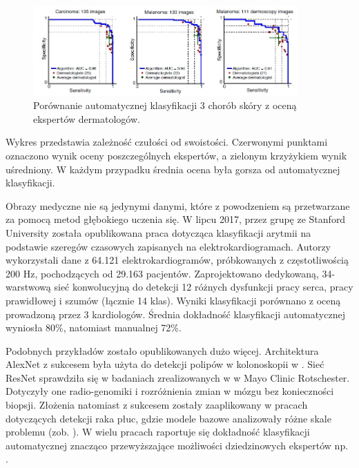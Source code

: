  \begin{figure}[h!]
 	\centering
 	\includegraphics[width=0.9\textwidth]{figures/CAD-dermatolodzy.jpg}
 	\caption{Porównanie automatycznej klasyfikacji 3 chorób skóry z oceną ekspertów dermatologów.}
 	\label{CAD_derma}
 \end{figure}

Wykres przedstawia zależność czułości od swoistości. Czerwonymi punktami oznaczono wynik oceny poszczególnych ekspertów, a zielonym krzyżykiem wynik uśredniony. W każdym przypadku średnia ocena była gorsza od automatycznej klasyfikacji.

Obrazy medyczne nie są jedynymi danymi, które z powodzeniem są przetwarzane za pomocą metod głębokiego uczenia się. W lipcu 2017, przez grupę ze Stanford University została opublikowana praca \cite{2017arXiv170701836R} dotycząca klasyfikacji arytmii na podstawie szeregów czasowych zapisanych na elektrokardiogramach. Autorzy wykorzystali dane z 64.121 elektrokardiogramów, próbkowanych z częstotliwością 200 Hz, pochodzących od 29.163 pacjentów. Zaprojektowano dedykowaną, 34-warstwową sieć konwolucyjną do detekcji 12 różnych dysfunkcji pracy serca, pracy prawidłowej i szumów (łącznie 14 klas). Wyniki klasyfikacji porównano z oceną prowadzoną przez 3 kardiologów. Średnia dokładność klasyfikacji automatycznej wyniosła 80\%, natomiast manualnej 72\%.

Podobnych przykładów zostało opublikowanych dużo więcej. Architektura AlexNet z sukcesem była użyta do detekcji polipów w kolonoskopii w \cite{Tajbakhsh2016}. Sieć ResNet sprawdziła się w badaniach zrealizowanych w \cite{Erickson2018} w Mayo Clinic Rotschester. Dotyczyły one radio-genomiki i rozróżnienia zmian w mózgu bez konieczności biopsji. Złożenia natomiast z sukcesem zostały zaaplikowany w pracach dotyczących detekcji raka płuc, gdzie modele bazowe analizowały różne skale problemu (zob. \cite{LungChalenge}). W wielu pracach raportuje się dokładność klasyfikacji automatycznej znacząco przewyższające możliwości dziedzinowych ekspertów np. \cite{Christiansen2018, Sarraf2016, Glasser2016, 2016arXiv160605718W}.

